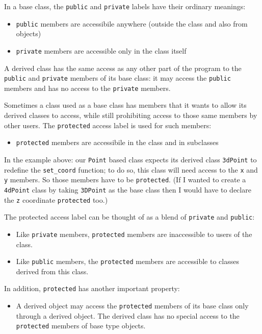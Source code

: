 In a base class, the \texttt{public} and \texttt{private} labels have their ordinary meanings: 
\begin{itemize}[$\triangleright$]
    \item \texttt{public} members are accessibile anywhere (outside the class and also from objects)

    \item \texttt{private} members are accessible only in the class itself
\end{itemize}

A derived class has the same access as any other part of the program to the \texttt{public} and \texttt{private} members of its base class: it may access the \texttt{public} members and has no access to the \texttt{private} members.

Sometimes a class used as a base class has members that it wants to allow its derived classes to access, while still prohibiting access to those same members by other users. The \texttt{protected} access label is used for such members:
\begin{itemize}[$\triangleright$]
    \item \texttt{protected} members are accessibile in the class and in subclasses
\end{itemize}

In the example above: our \texttt{Point} based class expects its derived class \texttt{3dPoint} to redefine the \texttt{set\_coord} function; to do so, this class will need access to the \texttt{x} and \texttt{y} members. So those members have to be \texttt{protected}. (If I wanted to create a \texttt{4dPoint} class by taking \texttt{3DPoint} as the base class then I would have to declare the \texttt{z} coordinate \texttt{protected} too.)

\newpage

The protected access label can be thought of as a blend of \texttt{private} and \texttt{public}:
\begin{itemize}[$\triangleright$]
    \item Like \texttt{private} members, \texttt{protected} members are inaccessible to users of the class.

    \item Like \texttt{public} members, the \texttt{protected} members are accessible to classes derived from this class.
\end{itemize}

In addition, \texttt{protected} has another important property:
\begin{itemize}[$\triangleright$]
    \item A derived object may access the \texttt{protected} members of its base class only through a derived object. The derived class has no special access to the \texttt{protected} members of base type objects.
\end{itemize}






















